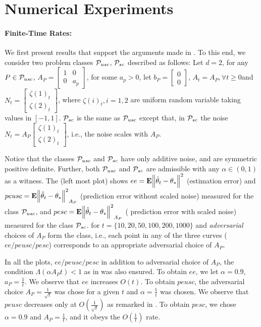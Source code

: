 \section{Numerical Experiments}
%

\paragraph{Finite-Time Rates:} We first present results that support the arguments made in . To this end, we consider two problem classes $\P_{usc}$, $\P_{sc}$ described as follows: Let $d=2$, for any $P\in \P_{usc}$, $A_P=\left[\begin{matrix}1 &0\\ 0 & a_p\end{matrix}\right]$, for some $a_p>0$, let $b_P=\left[\begin{matrix}0\\0\end{matrix}\right]$, $A_t=A_P,\forall t\geq 0$and $N_t=\left[\begin{matrix}\zeta(1)_t\\ \zeta(2)_t\end{matrix}\right]$, where $\zeta(i)_t, i=1,2$ are \iid uniform random variable taking values in $[-1,1]$. $\P_{sc}$ is the same as $\P_{usc}$ except that, in $\P_{sc}$ the noise $N_t=A_P \left[\begin{matrix}\zeta(1)_t\\ \zeta(2)_t\end{matrix}\right]$, i.e., the noise scales with $A_P$.

Notice that the classes $\P_{usc}$ and $\P_{sc}$ have only additive noise, and are symmetric positive definite. Further,  both $\P_{usc}$ and $\P_{sc}$ are admissible with any $\alpha\in(0,1)$ as a witness. The  (left most plot) shows $ee=\E{\norm{\thh_t-\ts}^2}$ (estimation error) and $peusc=\E{\norm{\thh_t-\ts}^2}_{A_P}$ (prediction error without scaled noise) measured for the class $\P_{usc}$,  and $pesc=\E{\norm{\thh_t-\ts}^2}_{A_P}$ ( prediction error with scaled noise)  measured for the class $\P_{sc}$. for $t=\{10,20,50,100,200,1000\}$ and \emph{adversarial} choices of $A_P$ form the class, i.e., each point in any of the three curves ($ee/peusc/pesc$) corresponds to an appropriate adversarial choice of $A_P$. 

In all the plots, $ee/peusc/pesc$ in addition to adversarial choice of $A_P$, the condition $\Lambda(\alpha A_P t )<1$ as in  was also ensured. 
To obtain $ee$, we let $\alpha=0.9$, $a_P=\frac{1}{t}$. We observe that $ee$ increases $O(t)$. To obtain $peusc$, the adversarial choice $A_P=\frac{1}{\sqrt{t}}$ was chose for a given $t$ and $\alpha=\frac{1}{t}$ was chosen. We observe that $peusc$ decreases only at $O(\frac{1}{\sqrt{t}})$ as remarked in . To obtain $pesc$, we chose $\alpha=0.9$ and $A_P=\frac{1}{t}$, and it obeys the $O(\frac{1}{t})$ rate.

